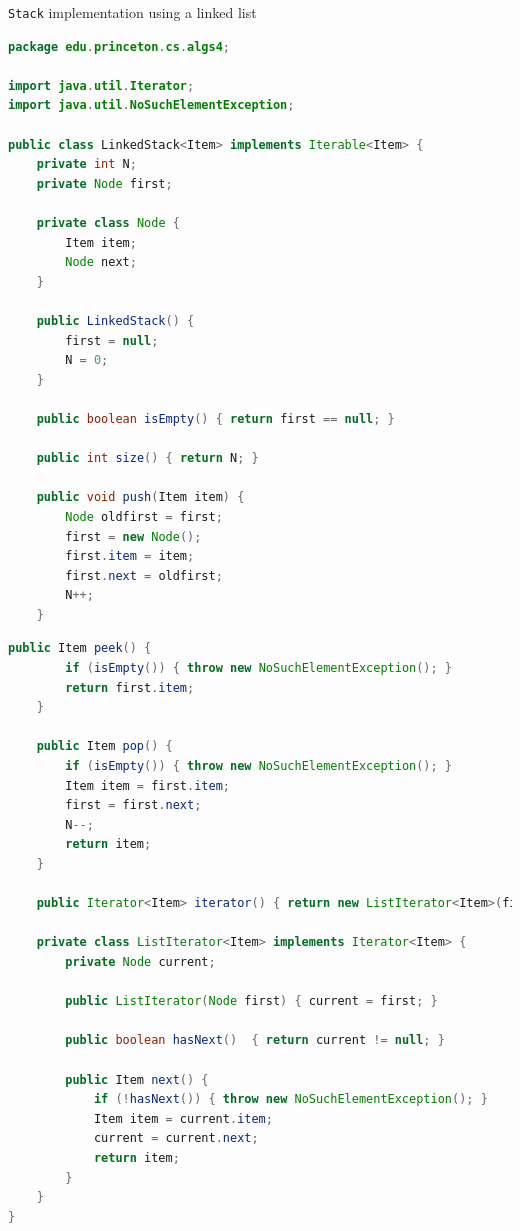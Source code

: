 \documentclass[8pt,a4paper,compress]{beamer}
\begin{document}
\begin{frame}[fragile]
\pause

\lstinline{Stack} implementation using a linked list
\begin{lstlisting}[language=Java]
package edu.princeton.cs.algs4;

import java.util.Iterator;
import java.util.NoSuchElementException;

public class LinkedStack<Item> implements Iterable<Item> {
    private int N; 
    private Node first; 
    
    private class Node {
        Item item;
        Node next;
    }

    public LinkedStack() {
        first = null; 
        N = 0;
    }

    public boolean isEmpty() { return first == null; }

    public int size() { return N; }

    public void push(Item item) {
        Node oldfirst = first;
        first = new Node(); 
        first.item = item;
        first.next = oldfirst;
        N++;
    }
\end{lstlisting}
\end{frame}

\begin{frame}[fragile]
\pause

\begin{lstlisting}[language=Java]
    public Item peek() {
        if (isEmpty()) { throw new NoSuchElementException(); }
        return first.item;
    }
    
    public Item pop() {
        if (isEmpty()) { throw new NoSuchElementException(); }
        Item item = first.item; 
        first = first.next; 
        N--;
        return item; 
    }

    public Iterator<Item> iterator() { return new ListIterator<Item>(first); }

    private class ListIterator<Item> implements Iterator<Item> {
        private Node current;

        public ListIterator(Node first) { current = first; }

        public boolean hasNext()  { return current != null; }

        public Item next() {
            if (!hasNext()) { throw new NoSuchElementException(); }
            Item item = current.item;
            current = current.next; 
            return item;
        }
    }
}
\end{lstlisting}
\end{frame}
\end{document}
